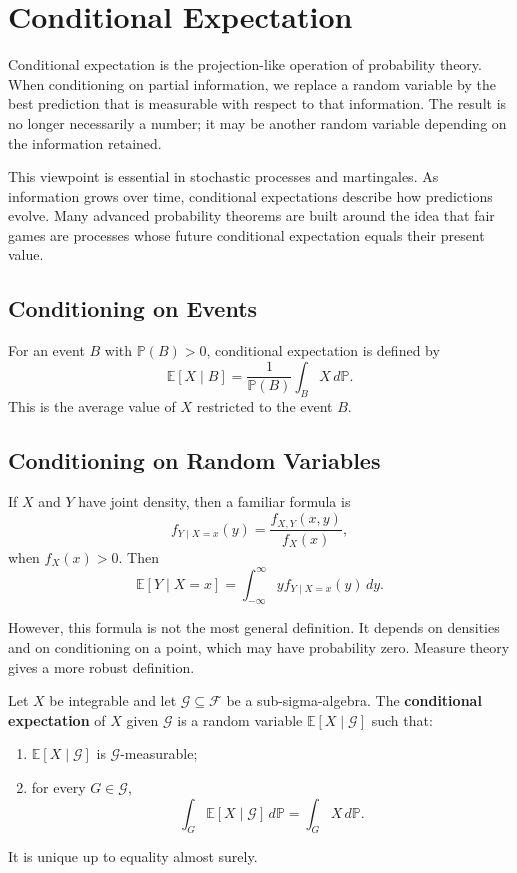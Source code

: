\section{Conditional Expectation}


Conditional expectation is the projection-like operation of probability theory. When conditioning on partial information, we replace a random variable by the best prediction that is measurable with respect to that information. The result is no longer necessarily a number; it may be another random variable depending on the information retained.

This viewpoint is essential in stochastic processes and martingales. As information grows over time, conditional expectations describe how predictions evolve. Many advanced probability theorems are built around the idea that fair games are processes whose future conditional expectation equals their present value.

\subsection{Conditioning on Events}

For an event $B$ with $\mathbb{P}(B)>0$, conditional expectation is defined by
\[
    \mathbb{E}[X\mid B]=\frac{1}{\mathbb{P}(B)}\int_B X\,d\mathbb{P}.
\]
This is the average value of $X$ restricted to the event $B$.

\subsection{Conditioning on Random Variables}

If $X$ and $Y$ have joint density, then a familiar formula is
\[
    f_{Y\mid X=x}(y)=\frac{f_{X,Y}(x,y)}{f_X(x)},
\]
when $f_X(x)>0$. Then
\[
    \mathbb{E}[Y\mid X=x]=\int_{-\infty}^{\infty}y f_{Y\mid X=x}(y)\,dy.
\]

However, this formula is not the most general definition. It depends on densities and on conditioning on a point, which may have probability zero. Measure theory gives a more robust definition.

\begin{definition}
Let $X$ be integrable and let $\mathcal{G}\subseteq\mathcal{F}$ be a sub-sigma-algebra. The \textbf{conditional expectation} of $X$ given $\mathcal{G}$ is a random variable $\mathbb{E}[X\mid\mathcal{G}]$ such that:
\begin{enumerate}
    \item $\mathbb{E}[X\mid\mathcal{G}]$ is $\mathcal{G}$-measurable;
    \item for every $G\in\mathcal{G}$,
    \[
        \int_G \mathbb{E}[X\mid\mathcal{G}]\,d\mathbb{P}=\int_G X\,d\mathbb{P}.
    \]
\end{enumerate}
It is unique up to equality almost surely.
\end{definition}

